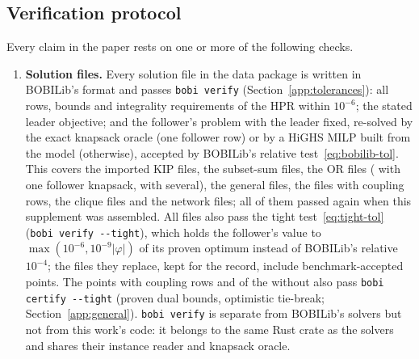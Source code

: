 \subsection{Verification protocol}\label{app:verification}

Every claim in the paper rests on one or more of the following checks.

\begin{enumerate}
\item \textbf{Solution files.} Every solution file in the data package is
written in BOBILib's format and passes \texttt{bobi verify}
(Section~\ref{app:tolerances}): all rows, bounds and integrality requirements of
the HPR within $10^{-6}$; the stated leader objective; and the follower's
problem with the leader fixed, re-solved by the exact knapsack oracle (one
follower row) or by a HiGHS MILP built from the model (otherwise), accepted
by BOBILib's relative test~\eqref{eq:bobilib-tol}. This covers the \NumKipFiles{}
imported KIP files, the \NumNewKip{} subset-sum files, the \NumOrPoints{} OR files (\NumVerifyOrOne{} with one
follower knapsack, \NumVerifyOrSeveral{} with several), the \NumGeneralFiles{} general files, the \NumCoupledFiles{} files with
coupling rows, the \NumVerifyClique{} clique files and the \NumVerifyNetwork{} network files; all of
them passed again when this supplement was assembled. All \NumTightFiles{}
files also pass the tight test~\eqref{eq:tight-tol} (\texttt{bobi verify
-{}-tight}), which holds the follower's value to $\max(10^{-6},10^{-9}|\varphi|)$ of
its proven optimum instead of BOBILib's relative $10^{-4}$; the
\NumTightSuperseded{} files they replace, kept for the record, include
\NumTightSupersededBench{} benchmark-accepted points. The points with
coupling rows and \NumGeneralTightCertified{} of the \NumGeneralFiles{} without
also pass \texttt{bobi certify -{}-tight} (proven dual bounds, optimistic
tie-break; Section~\ref{app:general}). \texttt{bobi verify} is separate from
BOBILib's solvers but not from this work's code: it belongs to the same Rust
crate as the solvers and shares their instance reader and knapsack oracle.


\end{enumerate}
